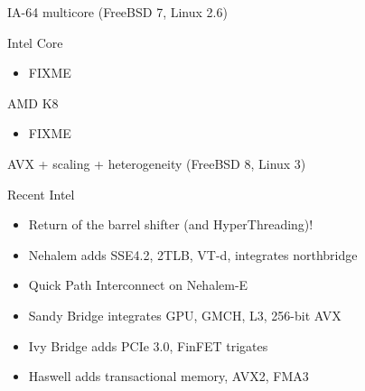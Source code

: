 \documentclass[mathserif,xcolor={dvipsnames,table}]{beamer}
\begin{document}
\begin{frame}[t]{IA-64 multicore (FreeBSD 7, Linux 2.6)}
\begin{block}{Intel Core}
\begin{itemize}
\item FIXME
\end{itemize}
\end{block}
\begin{block}{AMD K8}
\begin{itemize}
\item FIXME
\end{itemize}
\end{block}
\vfill
\begin{center}
\end{center}
\end{frame}

\begin{frame}[t]{AVX + scaling + heterogeneity (FreeBSD 8, Linux 3)}
\begin{block}{Recent Intel}
\begin{itemize}
\item Return of the barrel shifter (and HyperThreading)!
\item Nehalem adds SSE4.2, 2TLB, VT-d, integrates northbridge
\item Quick Path Interconnect on Nehalem-E
\item Sandy Bridge integrates GPU, GMCH, L3, 256-bit AVX
\item Ivy Bridge adds PCIe 3.0, FinFET trigates
\item Haswell adds transactional memory, AVX2, FMA3
\end{itemize}
\end{block}
\vfill
\begin{center}
\end{center}
\end{frame}
\end{document}
